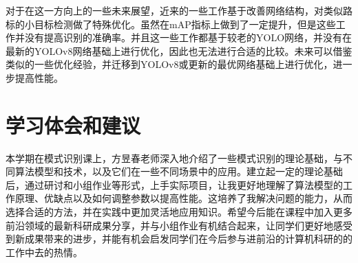 \documentclass{article}
\begin{document}
对于在这一方向上的一些未来展望，近来的一些工作基于改善网络结构，对类似路标的小目标检测做了特殊优化。虽然在mAP指标上做到了一定提升，但是这些工作并没有提高识别的准确率。并且这一些工作都基于较老的YOLO网络，并没有在最新的YOLOv8网络基础上进行优化，因此也无法进行合适的比较。未来可以借鉴类似的一些优化经验，并迁移到YOLOv8或更新的最优网络基础上进行优化，进一步提高性能。

\section{学习体会和建议}
本学期在模式识别课上，方昱春老师深入地介绍了一些模式识别的理论基础，与不同算法模型和技术，以及它们在一些不同场景中的应用。建立起一定的理论基础后，通过研讨和小组作业等形式，上手实际项目，让我更好地理解了算法模型的工作原理、优缺点以及如何调整参数以提高性能。这培养了我解决问题的能力，从而选择合适的方法，并在实践中更加灵活地应用知识。希望今后能在课程中加入更多前沿领域的最新科研成果分享，并与小组作业有机结合起来，让同学们更好地感受到新成果带来的进步，并能有机会启发同学们在今后参与进前沿的计算机科研的的工作中去的热情。



\appendix
\end{document}
